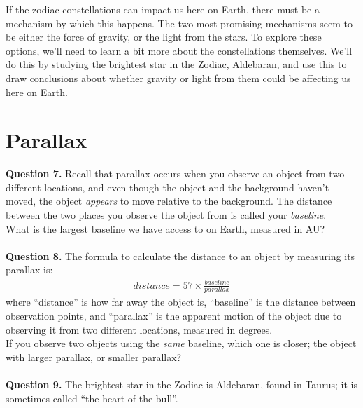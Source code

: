 \documentclass[11pt]{article}
\begin{document}
If the zodiac constellations can impact us here on Earth, there must be a mechanism by which this happens. The two most promising mechanisms seem to be either the force of gravity, or the light from the stars. To explore these options, we'll need to learn a bit more about the constellations themselves. We'll do this by studying the brightest star in the Zodiac, Aldebaran, and use this to draw conclusions about whether gravity or light from them could be affecting us here on Earth.\\

\newpage

\section{Parallax}

\textbf{Question 7.} Recall that parallax occurs when you observe an object from two different locations, and even though the object and the background haven't moved, the object \textit{appears} to move relative to the background. The distance between the two places you observe the object from is called your \textit{baseline}.\\

What is the largest baseline we have access to on Earth, measured in AU?\\

\vspace{1.5cm}
\hrulefill\\

\textbf{Question 8.} The formula to calculate the distance to an object by measuring its parallax is:
\begin{align*}
distance=57\times \frac{baseline}{parallax}
\end{align*}
where ``distance'' is how far away the object is, ``baseline'' is the distance between observation points, and ``parallax'' is the apparent motion of the object due to observing it from two different locations, measured in degrees.\\

If you observe two objects using the \textit{same} baseline, which one is closer; the object with larger parallax, or smaller parallax? \\

\vspace{1.5cm}
\hrulefill\\

\textbf{Question 9.} The brightest star in the Zodiac is Aldebaran, found in Taurus; it is sometimes called ``the heart of the bull''.\\ 
\end{document}
